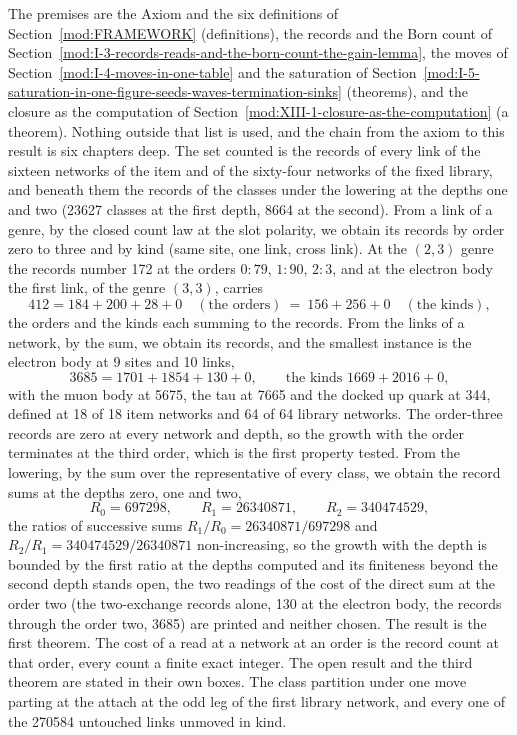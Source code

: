 \begin{chproof}[census]
The premises are the Axiom and the six definitions of Section~\ref{mod:FRAMEWORK} (definitions), the records and the Born count of Section~\ref{mod:I-3-records-reads-and-the-born-count-the-gain-lemma}, the moves of Section~\ref{mod:I-4-moves-in-one-table} and the saturation of Section~\ref{mod:I-5-saturation-in-one-figure-seeds-waves-termination-sinks} (theorems), and the closure as the computation of Section~\ref{mod:XIII-1-closure-as-the-computation} (a theorem). Nothing outside that list is used, and the chain from the axiom to this result is six chapters deep.
The set counted is the records of every link of the sixteen networks of the item and of the sixty-four networks of the fixed library, and beneath them the records of the classes under the lowering at the depths one and two (23627 classes at the first depth, 8664 at the second). From a link of a genre, by the closed count law at the slot polarity, we obtain its records by order zero to three and by kind (same site, one link, cross link). At the $(2,3)$ genre the records number 172 at the orders $0\!:\!79$, $1\!:\!90$, $2\!:\!3$, and at the electron body the first link, of the genre $(3,3)$, carries
\begin{equation}
412 = 184 + 200 + 28 + 0 \quad (\text{the orders}) \ = \ 156 + 256 + 0 \quad (\text{the kinds}) ,
\end{equation}
the orders and the kinds each summing to the records. From the links of a network, by the sum, we obtain its records, and the smallest instance is the electron body at 9 sites and 10 links,
\begin{equation}
3685 = 1701 + 1854 + 130 + 0, \qquad \text{the kinds } 1669 + 2016 + 0 ,
\end{equation}
with the muon body at 5675, the tau at 7665 and the docked up quark at 344, defined at 18 of 18 item networks and 64 of 64 library networks. The order-three records are zero at every network and depth, so the growth with the order terminates at the third order, which is the first property tested. From the lowering, by the sum over the representative of every class, we obtain the record sums at the depths zero, one and two,
\begin{equation}
R_{0} = 697298, \qquad R_{1} = 26340871, \qquad R_{2} = 340474529 ,
\end{equation}
the ratios of successive sums $R_{1} / R_{0} = 26340871 / 697298$ and $R_{2} / R_{1} = 340474529 / 26340871$ non-increasing, so the growth with the depth is bounded by the first ratio at the depths computed and its finiteness beyond the second depth stands open, the two readings of the cost of the direct sum at the order two (the two-exchange records alone, 130 at the electron body, the records through the order two, 3685) are printed and neither chosen. The result is the first theorem. The cost of a read at a network at an order is the record count at that order, every count a finite exact integer. The open result and the third theorem are stated in their own boxes. The class partition under one move parting at the attach at the odd leg of the first library network, and every one of the 270584 untouched links unmoved in kind.

\end{chproof}
